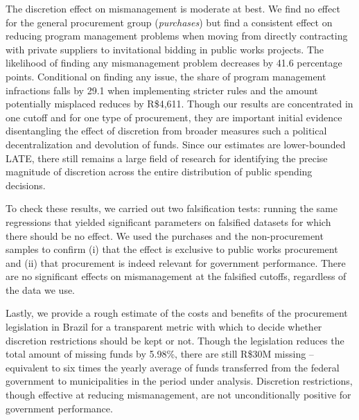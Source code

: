 \documentclass[11pt]{article}
\begin{document}
The discretion effect on mismanagement is moderate at best. We find no effect for the general procurement group (\emph{purchases}) but find a consistent effect on reducing program management problems when moving from directly contracting with private suppliers to invitational bidding in public works projects. The likelihood of finding any mismanagement problem decreases by 41.6 percentage points. Conditional on finding any issue, the share of program management infractions falls by 29.1 when implementing stricter rules and the amount potentially misplaced reduces by R\$4,611. Though our results are concentrated in one cutoff and for one type of procurement, they are important initial evidence disentangling the effect of discretion from broader measures such a political decentralization and devolution of funds. Since our estimates are lower-bounded LATE, there still remains a large field of research for identifying the precise magnitude of discretion across the entire distribution of public spending decisions.

To check these results, we carried out two falsification tests: running the same regressions that yielded significant parameters on falsified datasets for which there should be no effect. We used the purchases and the non-procurement samples to confirm (i) that the effect is exclusive to public works procurement and (ii) that procurement is indeed relevant for government performance. There are no significant effects on mismanagement at the falsified cutoffs, regardless of the data we use.

Lastly, we provide a rough estimate of the costs and benefits of the procurement legislation in Brazil for a transparent metric with which to decide whether discretion restrictions should be kept or not. Though the legislation reduces the total amount of missing funds by 5.98\%, there are still R\$30M missing -- equivalent to six times the yearly average of funds transferred from the federal government to municipalities in the period under analysis. Discretion restrictions, though effective at reducing mismanagement, are not unconditionally positive for government performance.

\clearpage

\setlength\bibsep{0pt}



\clearpage


\end{document}
